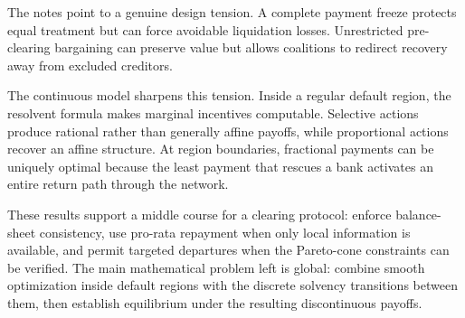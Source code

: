 \documentclass[11pt]{article}
\theoremstyle{definition}
\theoremstyle{remark}
\begin{document}
The notes point to a genuine design tension.  A complete payment freeze protects
equal treatment but can force avoidable liquidation losses.  Unrestricted
pre-clearing bargaining can preserve value but allows coalitions to redirect
recovery away from excluded creditors.

The continuous model sharpens this tension.  Inside a regular default region,
the resolvent formula makes marginal incentives computable.  Selective actions
produce rational rather than generally affine payoffs, while proportional
actions recover an affine structure.  At region boundaries, fractional
payments can be uniquely optimal because the least payment that rescues a bank
activates an entire return path through the network.

These results support a middle course for a clearing protocol: enforce
balance-sheet consistency, use pro-rata repayment when only local information
is available, and permit targeted departures when the Pareto-cone constraints
can be verified.  The main mathematical problem left is global: combine smooth
optimization inside default regions with the discrete solvency transitions
between them, then establish equilibrium under the resulting discontinuous
payoffs.
\end{document}
